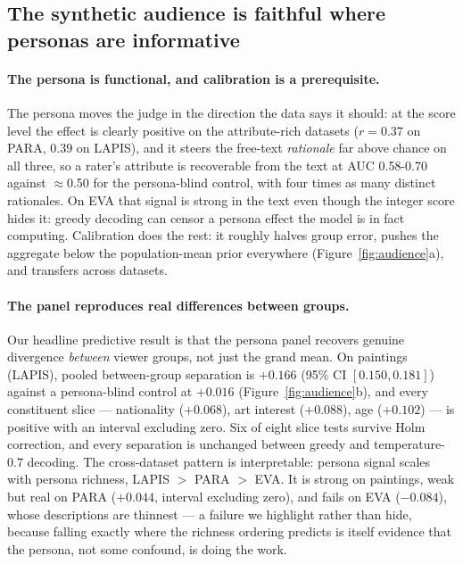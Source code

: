 \documentclass{article}
\begin{document}
\subsection{The synthetic audience is faithful where personas are informative}
\label{sec:audience}

\paragraph{The persona is functional, and calibration is a prerequisite.} The persona moves the judge in the direction the data says it should: at the score level the effect is clearly positive on the attribute-rich datasets ($r{=}0.37$ on PARA, $0.39$ on LAPIS), and it steers the free-text \emph{rationale} far above chance on all three, so a rater's attribute is recoverable from the text at AUC 0.58-0.70 against $\approx$0.50 for the persona-blind control, with four times as many distinct rationales. On EVA that signal is strong in the text even though the integer score hides it: greedy decoding can censor a persona effect the model is in fact computing. Calibration does the rest: it roughly halves group error, pushes the aggregate below the population-mean prior everywhere (Figure~\ref{fig:audience}a), and transfers across datasets.

\paragraph{The panel reproduces real differences between groups.} Our headline predictive result is that the persona panel recovers genuine divergence \emph{between} viewer groups, not just the grand mean. On paintings (LAPIS), pooled between-group separation is $+0.166$ (95\% CI $[0.150, 0.181]$) against a persona-blind control at $+0.016$ (Figure~\ref{fig:audience}b), and every constituent slice --- nationality ($+0.068$), art interest ($+0.088$), age ($+0.102$) --- is positive with an interval excluding zero. Six of eight slice tests survive Holm correction, and every separation is unchanged between greedy and temperature-0.7 decoding. The cross-dataset pattern is interpretable: persona signal scales with persona richness, LAPIS $>$ PARA $>$ EVA. It is strong on paintings, weak but real on PARA ($+0.044$, interval excluding zero), and fails on EVA ($-0.084$), whose descriptions are thinnest --- a failure we highlight rather than hide, because falling exactly where the richness ordering predicts is itself evidence that the persona, not some confound, is doing the work.
\end{document}
